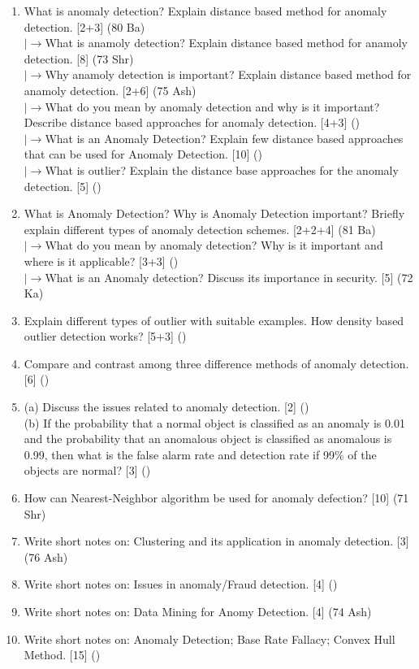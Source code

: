 \documentclass[12pt]{article}
\newcommand{\lb}{\\$\left|\rightarrow\right.$}
\begin{document}
    \begin{enumerate}[topsep=0pt, noitemsep]
      \item What is anomaly detection? Explain distance based method for anomaly detection. \hfill [2+3] (80 Ba)
        \lb What is anamoly detection? Explain distance based method for anamoly detection. \hfill [8] (73 Shr)
        \lb Why anamoly detection is important? Explain distance based method for anamoly detection. \hfill [2+6] (75 Ash)
        \lb What do you mean by anomaly detection and why is it important? Describe distance based approaches for anomaly detection. \hfill [4+3] ()
        \lb What is an Anomaly Detection? Explain few distance based approaches that can be used for Anomaly Detection. \hfill [10] ()
        \lb What is outlier? Explain the distance base approaches for the anomaly detection. \hfill [5] ()

      \item What is Anomaly Detection? Why is Anomaly Detection important? Briefly explain different types of anomaly detection schemes. \hfill [2+2+4] (81 Ba)
        \lb What do you mean by anomaly detection? Why is it important and where is it applicable? \hfill [3+3] ()
        \lb What is an Anomaly detection? Discuss its importance in security. \hfill [5] (72 Ka)

      \item Explain different types of outlier with suitable examples. How density based outlier detection works? \hfill [5+3] ()

      \item Compare and contrast among three difference methods of anomaly detection. \hfill [6] ()

      \item (a) Discuss the issues related to anomaly detection. \hfill [2] ()\\
        (b) If the probability that a normal object is classified as an anomaly is 0.01 and the probability that an anomalous object is classified as anomalous is 0.99, then what is the false alarm rate and detection rate if 99\% of the objects are normal? \hfill [3] ()

      \item How can Nearest-Neighbor algorithm be used for anomaly defection? \hfill [10] (71 Shr)

      \item Write short notes on: Clustering and its application in anomaly detection. \hfill [3] (76 Ash)

      \item Write short notes on: Issues in anomaly/Fraud detection. \hfill [4] ()

      \item Write short notes on: Data Mining for Anomy Detection. \hfill [4] (74 Ash)

      \item Write short notes on: Anomaly Detection; Base Rate Fallacy; Convex Hull Method. \hfill [15] ()
    \end{enumerate}
\end{document}
